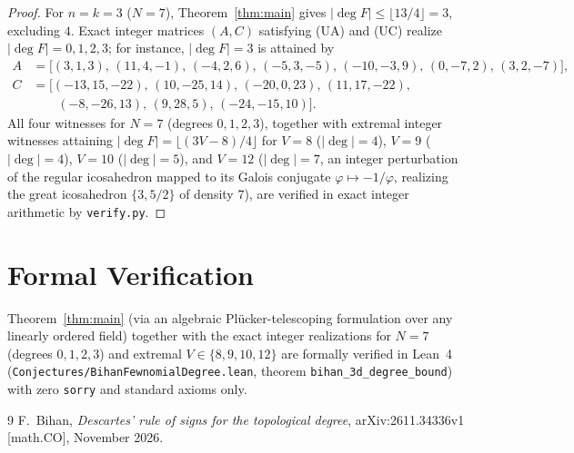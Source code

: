 \documentclass[11pt]{article}
\begin{document}
\begin{proof}
For $n=k=3$ ($N=7$), Theorem~\ref{thm:main} gives $|\deg F|\le \lfloor 13/4\rfloor = 3$, excluding $4$. Exact integer matrices $(A,C)$ satisfying \textup{(UA)} and \textup{(UC)} realize $|\deg F|=0,1,2,3$; for instance, $|\deg F|=3$ is attained by
\begin{align*}
A &= \bigl[(3,1,3),\,(11,4,-1),\,(-4,2,6),\,(-5,3,-5),\,(-10,-3,9),\,(0,-7,2),\,(3,2,-7)\bigr],\\
C &= \bigl[(-13,15,-22),\,(10,-25,14),\,(-20,0,23),\,(11,17,-22),\\
  &\qquad (-8,-26,13),\,(9,28,5),\,(-24,-15,10)\bigr].
\end{align*}
All four witnesses for $N=7$ (degrees $0,1,2,3$), together with extremal integer witnesses attaining $|\deg F|=\lfloor(3V-8)/4\rfloor$ for $V=8$ ($|\deg|=4$), $V=9$ ($|\deg|=4$), $V=10$ ($|\deg|=5$), and $V=12$ ($|\deg|=7$, an integer perturbation of the regular icosahedron mapped to its Galois conjugate $\varphi\mapsto -1/\varphi$, realizing the great icosahedron $\{3,5/2\}$ of density $7$), are verified in exact integer arithmetic by \texttt{verify.py}.
\end{proof}

\section*{Formal Verification}
Theorem~\ref{thm:main} (via an algebraic Pl\"ucker-telescoping formulation over any linearly ordered field) together with the exact integer realizations for $N=7$ (degrees $0,1,2,3$) and extremal $V\in\{8,9,10,12\}$ are formally verified in Lean~4 (\texttt{Conjectures/\allowbreak BihanFewnomialDegree.lean}, theorem \texttt{bihan\_3d\_\allowbreak degree\_bound}) with zero \texttt{sorry} and standard axioms only.

\begin{thebibliography}{9}
F.~Bihan, \emph{Descartes' rule of signs for the topological degree}, arXiv:2611.34336v1 [math.CO], November 2026.
\end{thebibliography}
\end{document}
